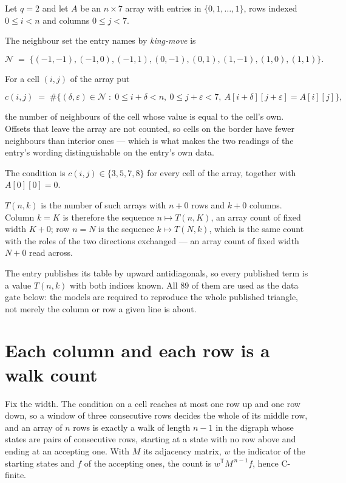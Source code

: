 \documentclass[11pt]{article}
\theoremstyle{definition}
\begin{document}
Let $q = 2$ and let $A$ be an $n \times 7$ array with entries in $\{0,1,\dots,1\}$, rows indexed $0 \le i < n$ and columns $0 \le j < 7$.

The neighbour set the entry names by {\itshape king-move} is

\[\mathcal{N} \;=\; \{(-1,-1), (-1,0), (-1,1), (0,-1), (0,1), (1,-1), (1,0), (1,1)\}.\]

For a cell $(i,j)$ of the array put

\[c(i,j) \;=\; \#\bigl\{(\delta,\varepsilon)\in\mathcal{N} \;:\; 0\le i+\delta<n,\ 0\le j+\varepsilon<7,\ A[i+\delta][j+\varepsilon] = A[i][j]\bigr\},\]

the number of neighbours of the cell whose value is equal to the cell's own. Offsets that leave the array are not counted, so cells on the border have fewer neighbours than interior ones --- which is what makes the two readings of the entry's wording distinguishable on the entry's own data.

The condition is $c(i,j) \in \{3, 5, 7, 8\}$ for every cell of the array, together with $A[0][0]=0$.

$T(n,k)$ is the number of such arrays with $n + 0$ rows and $k + 0$ columns. Column $k = K$ is therefore the sequence $n \mapsto T(n,K)$, an array count of fixed width $K + 0$; row $n = N$ is the sequence $k \mapsto T(N,k)$, which is the same count with the roles of the two directions exchanged --- an array count of fixed width $N + 0$ read across.

The entry publishes its table by upward antidiagonals, so every published term is a value $T(n,k)$ with both indices known. All 89 of them are used as the data gate below: the models are required to reproduce the whole published triangle, not merely the column or row a given line is about.

\section{Each column and each row is a walk count}

Fix the width. The condition on a cell reaches at most one row up and one row down, so a window of three consecutive rows decides the whole of its middle row, and an array of $n$ rows is exactly a walk of length $n-1$ in the digraph whose states are pairs of consecutive rows, starting at a state with no row above and ending at an accepting one. With $M$ its adjacency matrix, $w$ the indicator of the starting states and $f$ of the accepting ones, the count is $w^{\mathsf T}M^{\,n-1}f$, hence C-finite.
\end{document}
